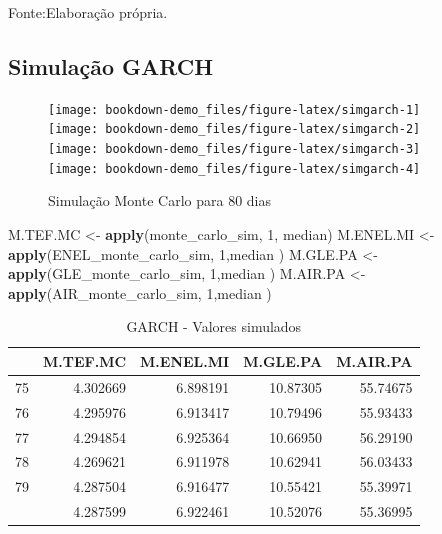 \documentclass[
  12pt,
  a4paper,
  openany]{book}
\newenvironment{Shaded}{\begin{snugshade}}{\end{snugshade}}
\newcommand{\DecValTok}[1]{\textcolor[rgb]{0.00,0.00,0.81}{#1}}
\newcommand{\KeywordTok}[1]{\textcolor[rgb]{0.13,0.29,0.53}{\textbf{#1}}}
\newcommand{\NormalTok}[1]{#1}
\newcommand{\StringTok}[1]{\textcolor[rgb]{0.31,0.60,0.02}{#1}}
\begin{document}
Fonte:Elaboração própria.

\justifying
\bigskip

\hypertarget{simulauxe7uxe3o-garch}{%
\subsection{Simulação GARCH}\label{simulauxe7uxe3o-garch}}

\scriptsize

\normalsize

\scriptsize

\normalsize

\begin{figure}

{\centering \texttt{[image: bookdown-demo\_files/figure-latex/simgarch-1]} \texttt{[image: bookdown-demo\_files/figure-latex/simgarch-2]} \texttt{[image: bookdown-demo\_files/figure-latex/simgarch-3]} \texttt{[image: bookdown-demo\_files/figure-latex/simgarch-4]} 

}

\caption{Simulação Monte Carlo para 80 dias}\label{fig:simgarch}
\end{figure}

\scriptsize

\begin{Shaded}
\begin{Highlighting}[]
\NormalTok{M.TEF.MC \textless{}{-}}\StringTok{ }\KeywordTok{apply}\NormalTok{(monte\_carlo\_sim, }\DecValTok{1}\NormalTok{, median)}
\NormalTok{M.ENEL.MI \textless{}{-}}\StringTok{ }\KeywordTok{apply}\NormalTok{(ENEL\_monte\_carlo\_sim, }\DecValTok{1}\NormalTok{,median )}
\NormalTok{M.GLE.PA \textless{}{-}}\StringTok{ }\KeywordTok{apply}\NormalTok{(GLE\_monte\_carlo\_sim, }\DecValTok{1}\NormalTok{,median )}
\NormalTok{M.AIR.PA \textless{}{-}}\StringTok{ }\KeywordTok{apply}\NormalTok{(AIR\_monte\_carlo\_sim, }\DecValTok{1}\NormalTok{,median )}
\end{Highlighting}
\end{Shaded}

\normalsize
\begin{table}[!h]

\caption{\label{tab:unnamed-chunk-50}GARCH - Valores simulados}
\centering
\begin{tabular}[t]{lrrrr}
\toprule
  & M.TEF.MC & M.ENEL.MI & M.GLE.PA & M.AIR.PA\\
\midrule
75 & 4.302669 & 6.898191 & 10.87305 & 55.74675\\
76 & 4.295976 & 6.913417 & 10.79496 & 55.93433\\
77 & 4.294854 & 6.925364 & 10.66950 & 56.29190\\
78 & 4.269621 & 6.911978 & 10.62941 & 56.03433\\
79 & 4.287504 & 6.916477 & 10.55421 & 55.39971\\
\addlinespace
80 & 4.287599 & 6.922461 & 10.52076 & 55.36995\\
\bottomrule
\end{tabular}
\end{table}
\FloatBarrier
\centering
\end{document}
